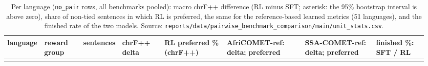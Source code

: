 {\footnotesize\setlength{\tabcolsep}{3pt}
\begin{longtable}[]{@{}
  >{\raggedright\arraybackslash}p{}
  >{\raggedright\arraybackslash}p{}
  >{\raggedleft\arraybackslash}p{}
  >{\raggedleft\arraybackslash}p{}
  >{\raggedleft\arraybackslash}p{}
  >{\raggedleft\arraybackslash}p{}
  >{\raggedleft\arraybackslash}p{}
  >{\raggedleft\arraybackslash}p{}@{}}
\caption{Per language (\protect\texttt{no\_pair} rows, all benchmarks pooled): macro chrF++ difference (RL minus SFT; asterisk: the 95\% bootstrap interval is above zero), share of non-tied sentences in which RL is preferred, the same for the reference-based learned metrics (51 languages), and the finished rate of the two models. Source: \protect\texttt{reports/data/pairwise\_benchmark\_comparison/main/unit\_stats.csv}.}\label{tab:t_pw_perlang}\tabularnewline
\toprule\noalign{}
\begin{minipage}[b]{\linewidth}\raggedright
language
\end{minipage} & \begin{minipage}[b]{\linewidth}\raggedright
reward group
\end{minipage} & \begin{minipage}[b]{\linewidth}\raggedleft
sentences
\end{minipage} & \begin{minipage}[b]{\linewidth}\raggedleft
chrF++ delta
\end{minipage} & \begin{minipage}[b]{\linewidth}\raggedleft
RL preferred \% (chrF++)
\end{minipage} & \begin{minipage}[b]{\linewidth}\raggedleft
AfriCOMET-ref: delta; preferred
\end{minipage} & \begin{minipage}[b]{\linewidth}\raggedleft
SSA-COMET-ref: delta; preferred
\end{minipage} & \begin{minipage}[b]{\linewidth}\raggedleft
finished \%: SFT / RL
\end{minipage} \\
\midrule\noalign{}
\endfirsthead
\toprule\noalign{}
\begin{minipage}[b]{\linewidth}\raggedright

\end{minipage}
\end{longtable}}
